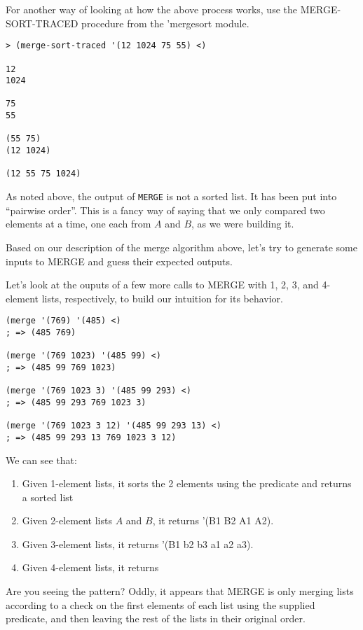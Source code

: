 \documentclass[12pt,openright,draft]{book}
\begin{document}
For another way of looking at how the above process works, use the
MERGE-SORT-TRACED procedure from the 'mergesort module.

\begin{verbatim}
> (merge-sort-traced '(12 1024 75 55) <)

12
1024

75
55

(55 75)
(12 1024)

(12 55 75 1024)
\end{verbatim}

As noted above, the output of \verb|MERGE| is not a sorted list.  It
has been put into ``pairwise order''.  This is a fancy way of saying
that we only compared two elements at a time, one each from $A$ and
$B$, as we were building it.

Based on our description of the merge algorithm above, let's try to
generate some inputs to MERGE and guess their expected outputs.

\break

Let's look at the ouputs of a few more calls to MERGE with 1, 2, 3, and
4-element lists, respectively, to build our intuition for its
behavior.

\begin{verbatim}
(merge '(769) '(485) <)
; => (485 769)

(merge '(769 1023) '(485 99) <)
; => (485 99 769 1023)

(merge '(769 1023 3) '(485 99 293) <)
; => (485 99 293 769 1023 3)

(merge '(769 1023 3 12) '(485 99 293 13) <)
; => (485 99 293 13 769 1023 3 12)
\end{verbatim}

We can see that:

\begin{enumerate}
  \item Given 1-element lists, it sorts the 2 elements using the
    predicate and returns a sorted list

  \item Given 2-element lists $A$ and $B$, it returns '(B1 B2 A1 A2).

  \item Given 3-element lists, it returns '(B1 b2 b3 a1 a2 a3).

  \item Given 4-element lists, it returns
\end{enumerate}

Are you seeing the pattern?  Oddly, it appears that MERGE is only
merging lists according to a check on the first elements of each list
using the supplied predicate, and then leaving the rest of the lists
in their original order.
\end{document}
